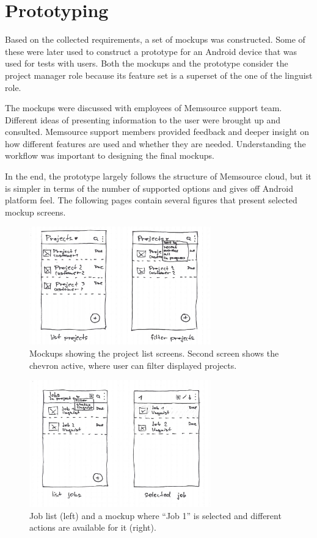 \section{Prototyping}

Based on the collected requirements, a set of mockups was constructed. Some of these were later used to construct a prototype for an Android device that was used for tests with users. Both the mockups and the prototype consider the project manager role because its feature set is a superset of the one of the linguist role.

The mockups were discussed with employees of Memsource support team. Different ideas of presenting information to the user were brought up and consulted. Memsource support members provided feedback and deeper insight on how different features are used and whether they are needed. Understanding the workflow was important to designing the final mockups.

In the end, the prototype largely follows the structure of Memsource cloud, but it is simpler in terms of the number of supported options and gives off Android platform feel. The following pages contain several figures that present selected mockup screens.



\begin{figure}[]
	\includegraphics[width=0.7\textwidth]{pics/projects1}
	\caption{Mockups showing the project list screens. Second screen shows the chevron active, where user can filter displayed projects.}
	\label{mock2}
\end{figure}

\begin{figure}[H]
	\includegraphics[width=0.7\textwidth]{pics/jobs1}
	\caption{Job list (left) and a mockup where ``Job 1'' is selected and different actions are available for it (right).}
	\label{mock3}
\end{figure}

